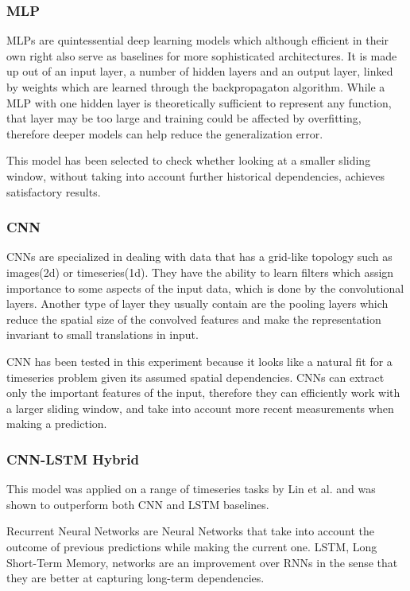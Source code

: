 \documentclass[12pt]{article}
\begin{document}
\subsubsection{MLP}
MLPs are quintessential deep learning models which although efficient in their own right also serve as baselines for more sophisticated architectures\cite{mit_dlbook}. It is made up out of an input layer, a number of hidden layers and an output layer, linked by weights which are learned through the backpropagaton algorithm. While a MLP with one hidden layer is theoretically sufficient to represent any function, that layer may be too large and training could be affected by overfitting, therefore deeper models can help reduce the generalization error\cite{neural_smithing}. 

This model has been selected to check whether looking at a smaller sliding window, without taking into account further historical dependencies, achieves satisfactory results.

\subsubsection{CNN}
CNNs are specialized in dealing with data that has a grid-like topology such as images(2d) or timeseries(1d)\cite{mit_dlbook}. They have the ability to learn filters which assign importance to some aspects of the input data, which is done by the convolutional layers. Another type of layer they usually contain are the pooling layers which reduce the spatial size of the convolved features and make the representation invariant to small translations in input.

CNN has been tested in this experiment because it looks like a natural fit for a timeseries problem given its assumed spatial dependencies. CNNs can extract only the important features of the input, therefore they can efficiently work with a larger sliding window, and take into account more recent measurements when making a prediction. 

\subsubsection{CNN-LSTM Hybrid}
This model was applied on a range of timeseries tasks by Lin et al.\cite{cnn_lstm} and was shown to outperform both CNN and LSTM baselines.

Recurrent Neural Networks are Neural Networks that take into account the outcome of previous predictions while making the current one\cite{mit_dlbook}. LSTM, Long Short-Term Memory, networks are an improvement over RNNs in the sense that they are better at capturing long-term dependencies\cite{lstm}.
\end{document}
